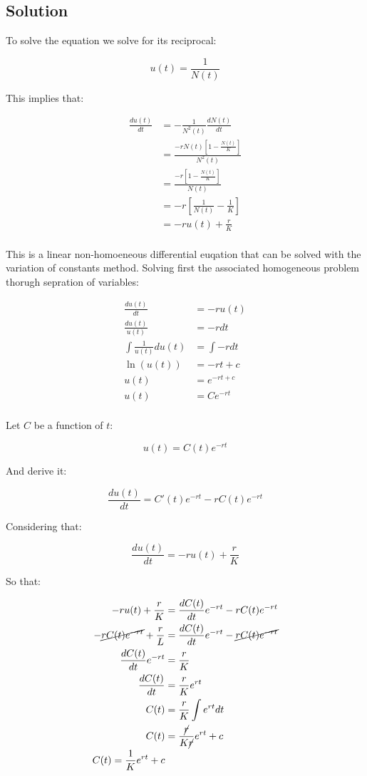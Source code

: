   \subsection{Solution}
  To solve the equation we solve for its reciprocal:

  $$u(t) = \frac{1}{N(t)}$$

  This implies that:

  \begin{align*}
    \frac{du(t)}{dt} &= -\frac{1}{N^2(t)}\frac{dN(t)}{dt}\\
                     &= \frac{-rN(t)\left[1-\frac{N(t)}{K}\right]}{N^2(t)}\\
                     &= \frac{-r\left[1-\frac{N(t)}{K}\right]}{N(t)}\\
                     &= -r\left[\frac{1}{N(t)}-\frac{1}{K}\right]\\
                     &= -ru(t) + \frac{r}{K}\\
  \end{align*}

  This is a linear non-homoeneous differential euqation that can be solved with the variation of constants method.
  Solving first the associated homogeneous problem thorugh sepration of variables:

  \begin{align*}
    \frac{du(t)}{dt} &= -ru(t)\\
    \frac{du(t)}{u(t)} &= -rdt\\
    \int\frac{1}{u(t)}du(t) &= \int-rdt\\
    \ln(u(t)) &= -rt + c\\
    u(t) &= e^{-rt+c}\\
    u(t) &= Ce^{-rt}\\
  \end{align*}

  Let $C$ be a function of $t$:

  $$u(t) = C(t)e^{-rt}$$

  And derive it:

  $$\frac{du(t)}{dt} = C'(t)e^{-rt} - rC(t)e^{-rt}$$

  Considering that:

  $$\frac{du(t)}{dt} = -ru(t)+\frac{r}{K}$$

  So that:

  \begin{align*}
    -ru(t) + \frac{r}{K} &= \frac{dC(t)}{dt}e^{-rt} - rC(t)e^{-rt}\\
    -\cancel{rC(t)e^{-rt}}+ \frac{r}{L} &= \frac{dC(t)}{dt}e^{-rt} - \cancel{rC(t)e^{-rt}}\\
    \frac{dC(t)}{dt}e^{-rt} &= \frac{r}{K}\\
    \frac{dC(t)}{dt} &= \frac{r}{K}e^{rt}\\
    C(t) &= \frac{r}{K}\int e^{rt}dt\\
    C(t) &= \frac{\cancel{r}}{K\cancel{r}}e^{rt} + c\\
    C(t) = \frac{1}{K}e^{rt} + c\\
  \end{align*}

